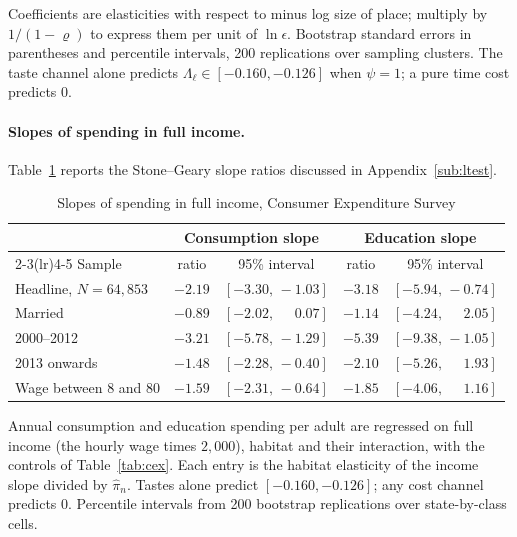 \documentclass[11pt]{article}
\begin{document}
\begin{table}[h!]
\begin{threeparttable}
\begin{tabular}{lrcccc}
\bottomrule
\end{tabular}
\begin{tablenotes}\footnotesize
\item Coefficients are elasticities with respect to minus log size of place; multiply by
$1/(1-\varrho)$ to express them per unit of $\ln\epsilon$. Bootstrap standard errors in parentheses
and percentile intervals, 200 replications over sampling clusters. The taste channel alone predicts
$\Lambda_\ell\in[-0.160,-0.126]$ when $\psi=1$; a pure time cost predicts $0$.
\end{tablenotes}
\end{threeparttable}
\end{table}

\paragraph{Slopes of spending in full income.}
Table~\ref{tab:sg} reports the Stone--Geary slope ratios discussed in Appendix~\ref{sub:ltest}.

\begin{table}[h!]\centering
\begin{threeparttable}
\caption{Slopes of spending in full income, Consumer Expenditure Survey}
\label{tab:sg}
\footnotesize\setlength{\tabcolsep}{4pt}
\begin{tabular}{lcccc}
\toprule
& \multicolumn{2}{c}{Consumption slope} & \multicolumn{2}{c}{Education slope}\\
\cmidrule(lr){2-3}\cmidrule(lr){4-5}
Sample & ratio & 95\% interval & ratio & 95\% interval\\
\midrule
Headline, $N=64{,}853$ & $-2.19$ & $[-3.30,\,-1.03]$ & $-3.18$ & $[-5.94,\,-0.74]$\\
Married                & $-0.89$ & $[-2.02,\,\phantom{-}0.07]$ & $-1.14$ & $[-4.24,\,\phantom{-}2.05]$\\
2000--2012             & $-3.21$ & $[-5.78,\,-1.29]$ & $-5.39$ & $[-9.38,\,-1.05]$\\
2013 onwards           & $-1.48$ & $[-2.28,\,-0.40]$ & $-2.10$ & $[-5.26,\,\phantom{-}1.93]$\\
Wage between 8 and 80  & $-1.59$ & $[-2.31,\,-0.64]$ & $-1.85$ & $[-4.06,\,\phantom{-}1.16]$\\
\bottomrule
\end{tabular}
\begin{tablenotes}\footnotesize
\item Annual consumption and education spending per adult are regressed on full income (the hourly
wage times $2{,}000$), habitat and their interaction, with the controls of Table~\ref{tab:cex}.
Each entry is the habitat elasticity of the income slope divided by $\hat\pi_n$. Tastes alone
predict $[-0.160,-0.126]$; any cost channel predicts $0$. Percentile intervals from 200 bootstrap
replications over state-by-class cells.
\end{tablenotes}
\end{threeparttable}
\end{table}
\end{document}

